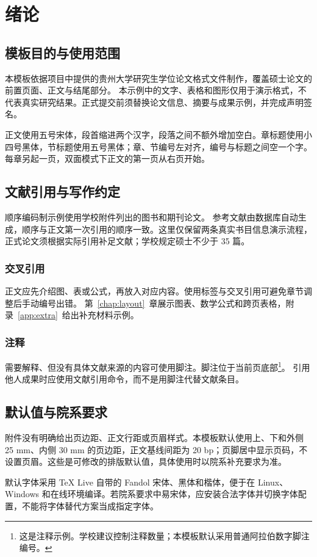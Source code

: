 \chapter{绪论}
\label{chap:introduction}
\section{模板目的与使用范围}
本模板依据项目中提供的贵州大学研究生学位论文格式文件制作，覆盖硕士论文的前置页面、正文与结尾部分。
本示例中的文字、表格和图形仅用于演示格式，不代表真实研究结果。正式提交前须替换论文信息、摘要与成果示例，并完成声明签名。

正文使用五号宋体，段首缩进两个汉字，段落之间不额外增加空白。章标题使用小四号黑体，节标题使用五号黑体；章、节编号左对齐，编号与标题之间空一个字。每章另起一页，双面模式下正文的第一页从右页开始。

\section{文献引用与写作约定}
顺序编码制示例使用学校附件列出的图书\cite{zhang2002}和期刊论文\cite{li2000}。
参考文献由数据库自动生成，顺序与正文第一次引用的顺序一致。这里仅保留两条真实书目信息演示流程，正式论文须根据实际引用补足文献；学校规定硕士不少于 35 篇。

\subsection{交叉引用}
正文应先介绍图、表或公式，再放入对应内容。使用标签与交叉引用可避免章节调整后手动编号出错。
第~\ref{chap:layout}~章展示图表、数学公式和跨页表格，附录~\ref{app:extra}~给出补充材料示例。

\subsection{注释}
需要解释、但没有具体文献来源的内容可使用脚注。脚注位于当前页底部\footnote{这是注释示例。学校建议控制注释数量；本模板默认采用普通阿拉伯数字脚注编号。}。
引用他人成果时应使用文献引用命令，而不是用脚注代替文献条目。

\section{默认值与院系要求}
附件没有明确给出页边距、正文行距或页眉样式。本模板默认使用上、下和外侧 25 mm、内侧 30 mm 的页边距，正文基线间距为 20 bp；页脚居中显示页码，不设置页眉。这些是可修改的排版默认值，具体使用时以院系补充要求为准。

默认字体采用 TeX Live 自带的 Fandol 宋体、黑体和楷体，便于在 Linux、Windows 和在线环境编译。若院系要求中易宋体，应安装合法字体并切换字体配置，不能将字体替代方案当成指定字体。
